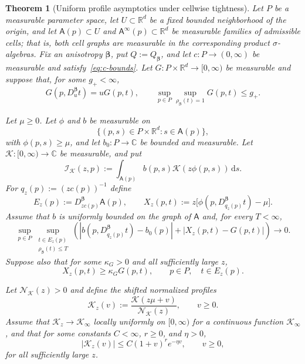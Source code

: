 \documentclass[11pt]{amsart}
\numberwithin{equation}{section}
\newtheorem{theorem}{Theorem}[section]
\theoremstyle{definition}
\theoremstyle{remark}
\newcommand{\R}{\mathbb{R}}
\newcommand{\C}{\mathbb{C}}
\newcommand{\dd}{\,\mathrm{d}}
\newcommand{\cI}{\mathcal{I}}
\newcommand{\Afib}{\mathsf{A}}
\begin{document}
\begin{theorem}[Uniform profile asymptotics under cellwise tightness]
\label{thm:profile-leading}
Let $P$ be a measurable parameter space, let $U\subset\R^d$ be a fixed bounded
neighborhood of the origin, and let $\Afib(p)\subset U$ and
$\Afib^\infty(p)\subset\R^d$ be measurable families of admissible cells; that is,
both cell graphs are measurable in the corresponding product $\sigma$-algebras.
Fix an anisotropy $\bm\beta$, put $Q:=Q_{\bm\beta}$, and let
$c:P\to(0,\infty)$ be measurable and satisfy~\eqref{eq:c-bounds}.  Let
$G:P\times\R^d\to[0,\infty)$ be measurable and suppose that, for some
$g_+<\infty$,
\begin{equation}\label{eq:profile-model-upper-bound}
 G(p,D_u^{\bm\beta}t)=uG(p,t),
 \qquad
 \sup_{p\in P}\sup_{\rho_{\bm\beta}(t)=1}G(p,t)\le g_+.
\end{equation}

Let $\mu\ge0$.  Let $\phi$ and $b$ be measurable on
\[
 \{(p,s)\in P\times\R^d:s\in\Afib(p)\},
\]
with $\phi(p,s)\ge\mu$, and let $b_0:P\to\C$ be bounded and measurable.
Let $\mathcal K:[0,\infty)\to\C$ be measurable, and put
\begin{equation}\label{eq:profile-integral-definition}
 \cI_{\mathcal K}(z,p):=\int_{\Afib(p)} b(p,s)\mathcal K(z\phi(p,s))\dd s.
\end{equation}
For
$q_z(p):=(zc(p))^{-1}$ define
\begin{equation}\label{eq:profile-rescaled-data}
 E_z(p):=D_{zc(p)}^{\bm\beta}\Afib(p),
 \qquad
 X_z(p,t):=z\bigl[\phi(p,D_{q_z(p)}^{\bm\beta}t)-\mu\bigr].
\end{equation}
Assume that $b$ is uniformly bounded on the graph of $\Afib$ and, for every
$T<\infty$,
\begin{equation}\label{eq:profile-local-convergence}
 \sup_{p\in P}
 \sup_{\substack{t\in E_z(p)\\ \rho_{\bm\beta}(t)\le T}}
 \left(
 |b(p,D_{q_z(p)}^{\bm\beta}t)-b_0(p)|
 +|X_z(p,t)-G(p,t)|
 \right)\longrightarrow0.
\end{equation}
Suppose also that for some $\kappa_G>0$ and all sufficiently large $z$,
\begin{equation}\label{eq:profile-scaled-lower-bound}
 X_z(p,t)\ge\kappa_G G(p,t),
 \qquad p\in P,\quad t\in E_z(p).
\end{equation}

Let $\mathcal N_{\mathcal K}(z)>0$ and define the shifted normalized profiles
\begin{equation}\label{eq:normalized-profile-family}
 \mathcal K_z(v):=\frac{\mathcal K(z\mu+v)}{\mathcal N_{\mathcal K}(z)},
 \qquad v\ge0.
\end{equation}
Assume that $\mathcal K_z\to \mathcal K_\infty$ locally uniformly on $[0,\infty)$ for a
continuous function $\mathcal K_\infty$, and that for some constants $C<\infty$,
$r\ge0$, and $\eta>0$,
\begin{equation}\label{eq:profile-envelope}
 |\mathcal K_z(v)|\le C(1+v)^r e^{-\eta v},
 \qquad v\ge0,
\end{equation}
for all sufficiently large $z$.


\end{theorem}
\end{document}
